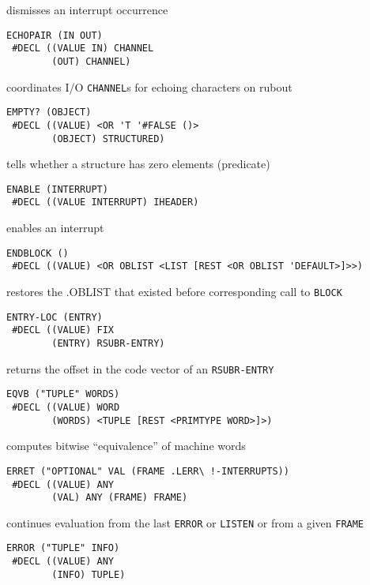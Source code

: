 \documentclass[a4paper,]{article}
\begin{document}
dismisses an interrupt occurrence

\begin{verbatim}
ECHOPAIR (IN OUT)
 #DECL ((VALUE IN) CHANNEL
        (OUT) CHANNEL)
\end{verbatim}

coordinates I/O \texttt{CHANNEL}s for echoing characters on rubout

\begin{verbatim}
EMPTY? (OBJECT)
 #DECL ((VALUE) <OR 'T '#FALSE ()>
        (OBJECT) STRUCTURED)
\end{verbatim}

tells whether a structure has zero elements (predicate)

\begin{verbatim}
ENABLE (INTERRUPT)
 #DECL ((VALUE INTERRUPT) IHEADER)
\end{verbatim}

enables an interrupt

\begin{verbatim}
ENDBLOCK ()
 #DECL ((VALUE) <OR OBLIST <LIST [REST <OR OBLIST 'DEFAULT>]>>)
\end{verbatim}

restores the .OBLIST that existed before corresponding call to \texttt{BLOCK}

\begin{verbatim}
ENTRY-LOC (ENTRY)
 #DECL ((VALUE) FIX
        (ENTRY) RSUBR-ENTRY)
\end{verbatim}

returns the offset in the code vector of an \texttt{RSUBR-ENTRY}

\begin{verbatim}
EQVB ("TUPLE" WORDS)
 #DECL ((VALUE) WORD
        (WORDS) <TUPLE [REST <PRIMTYPE WORD>]>)
\end{verbatim}

computes bitwise ``equivalence'' of machine words

\begin{verbatim}
ERRET ("OPTIONAL" VAL (FRAME .LERR\ !-INTERRUPTS))
 #DECL ((VALUE) ANY
        (VAL) ANY (FRAME) FRAME)
\end{verbatim}

continues evaluation from the last \texttt{ERROR} or \texttt{LISTEN} or from a given \texttt{FRAME}

\begin{verbatim}
ERROR ("TUPLE" INFO)
 #DECL ((VALUE) ANY
        (INFO) TUPLE)
\end{verbatim}
\end{document}

